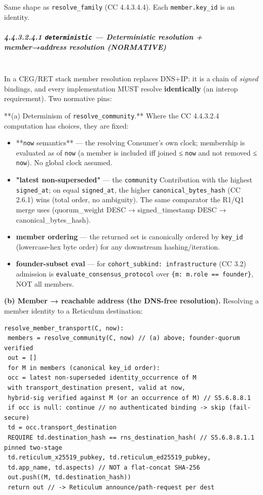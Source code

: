 \documentclass[11pt]{article}
\begin{document}
Same shape as \texttt{resolve\_family} (CC 4.4.3.4.4). Each \texttt{member.key\_id} is an identity.


\subparagraph{4.4.3.2.4.1 \texttt{deterministic} — Deterministic resolution + member→address resolution (NORMATIVE)}\mbox{}\\


In a CEG/RET stack member resolution replaces DNS+IP: it is a chain of \textit{signed} bindings, and every implementation MUST resolve \textbf{identically} (an interop requirement). Two normative pins:


**(a) Determinism of \texttt{resolve\_community}.** Where the CC 4.4.3.2.4 computation has choices, they are fixed:

\begin{itemize}\setlength\itemsep{0pt}
\item **\texttt{now} semantics** — the resolving Consumer's own clock; membership is evaluated as of \texttt{now} (a member is included iff joined ≤ \texttt{now} and not removed ≤ \texttt{now}). No global clock assumed.
\item \textbf{"latest non-superseded"} — the \texttt{community} Contribution with the highest \texttt{signed\_at}; on equal \texttt{signed\_at}, the higher \texttt{canonical\_bytes\_hash} (CC 2.6.1) wins (total order, no ambiguity). The same comparator the R1/Q1 merge uses (quorum\_weight DESC → signed\_timestamp DESC → canonical\_bytes\_hash).
\item \textbf{member ordering} — the returned set is canonically ordered by \texttt{key\_id} (lowercase-hex byte order) for any downstream hashing/iteration.
\item \textbf{founder-subset eval} — for \texttt{cohort\_subkind: infrastructure} (CC 3.2) admission is \texttt{evaluate\_consensus\_protocol} over \texttt{\{m: m.role == founder\}}, NOT all members.
\end{itemize}


\textbf{(b) Member → reachable address (the DNS-free resolution).} Resolving a member identity to a Reticulum destination:


\begin{lstlisting}
resolve_member_transport(C, now):
 members = resolve_community(C, now) // (a) above; founder-quorum verified
 out = []
 for M in members (canonical key_id order):
 occ = latest non-superseded identity_occurrence of M
 with transport_destination present, valid at now,
 hybrid-sig verified against M (or an occurrence of M) // S5.6.8.8.1
 if occ is null: continue // no authenticated binding -> skip (fail-secure)
 td = occ.transport_destination
 REQUIRE td.destination_hash == rns_destination_hash( // S5.6.8.8.1.1 pinned two-stage
 td.reticulum_x25519_pubkey, td.reticulum_ed25519_pubkey,
 td.app_name, td.aspects) // NOT a flat-concat SHA-256
 out.push((M, td.destination_hash))
 return out // -> Reticulum announce/path-request per dest
\end{lstlisting}
\end{document}
